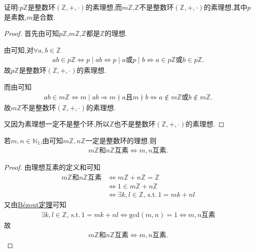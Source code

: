 \documentclass[../../main.tex]{subfiles}
\begin{document}
\begin{example}
证明:$p\mathbb{Z}$是整数环$(\mathbb{Z},+,\cdot)$的素理想,而$m\mathbb{Z}$,$\mathbb{Z}$不是整数环$(\mathbb{Z},+,\cdot)$的素理想,其中$p$是素数,$m$是合数.
\end{example}
\begin{proof}
首先由可知$p\mathbb{Z}$,$m\mathbb{Z}$,$\mathbb{Z}$都是$\mathbb{Z}$的理想.

由可知,对$\forall a,b\in \mathbb{Z}$
\begin{align*}
ab\in p\mathbb{Z} \Leftrightarrow p\mid ab\Leftrightarrow p\mid a\text{或}p\mid b\Leftrightarrow a\in p\mathbb{Z} \text{或}b\in p\mathbb{Z} .
\end{align*}
故$p\mathbb{Z}$是整数环$(\mathbb{Z},+,\cdot)$的素理想.

而由可知
\begin{align*}
ab\in m\mathbb{Z} \Leftrightarrow m\mid ab\Rightarrow m\nmid a\text{且}m\nmid b\Leftrightarrow a\notin m\mathbb{Z} \text{或}b\notin m\mathbb{Z} .
\end{align*}
故$m\mathbb{Z}$不是整数环$(\mathbb{Z},+,\cdot)$的素理想.

又因为素理想一定不是整个环,所以$\mathbb{Z}$也不是整数环$(\mathbb{Z},+,\cdot)$的素理想.
\end{proof}

\begin{proposition}
若$m,n\in \mathbb{N}_1$,由可知$m\mathbb{Z},n\mathbb{Z}$一定是整数环的理想.则
\begin{align*}
m\mathbb{Z}\text{和}n\mathbb{Z}\text{互素} \iff m,n\text{互素}.
\end{align*}
\end{proposition}
\begin{proof}
由理想互素的定义和可知
\begin{align*}
m\mathbb{Z} \text{和}n\mathbb{Z} \text{互素}
&\Longleftrightarrow m\mathbb{Z} +n\mathbb{Z} =\mathbb{Z} \\
&\Longleftrightarrow 1\in m\mathbb{Z} +n\mathbb{Z} \\
&\Longleftrightarrow \exists k,l\in \mathbb{Z},\,\mathrm{s}.\mathrm{t}.\,1=mk+nl
\end{align*}
又由\hyperref[lemma:Bézout定理]{Bézout定理}可知
\begin{align*}
\exists k,l\in \mathbb{Z},\,\mathrm{s}.\mathrm{t}.\,1=mk+nl
\Longleftrightarrow \mathrm{gcd}(m,n) = 1 
\Longleftrightarrow m,n\text{互素}
\end{align*}
故
\begin{align*}
m\mathbb{Z} \text{和}n\mathbb{Z} \text{互素} \Longleftrightarrow m,n\text{互素}.
\end{align*}
\end{proof}
\end{document}
